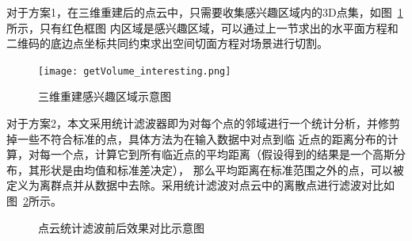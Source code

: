 对于方案1，在三维重建后的点云中，只需要收集感兴趣区域内的3D点集，如图~\ref{fig:getVolume_interesting}所示，只有红色框图
内区域是感兴趣区域，可以通过上一节求出的水平面方程和二维码的底边点坐标共同约束求出空间切面方程对场景进行切割。
\begin{figure}[H] %
  \centering
  \texttt{[image: getVolume\_interesting.png]}
  \caption{三维重建感兴趣区域示意图}
  \label{fig:getVolume_interesting}
\end{figure}
对于方案2，本文采用统计滤波器即为对每个点的邻域进行一个统计分析，并修剪掉一些不符合标准的点，具体方法为在输入数据中对点到临
近点的距离分布的计算，对每一个点，计算它到所有临近点的平均距离（假设得到的结果是一个高斯分布，其形状是由均值和标准差决定），
那么平均距离在标准范围之外的点，可以被定义为离群点并从数据中去除。采用统计滤波对点云中的离散点进行滤波对比如
图~\ref{fig:getVolume_3dconstr_filter}所示。
\begin{figure}[H]
  \centering
  \vskip0.5cm
  \caption{点云统计滤波前后效果对比示意图}\label{fig:getVolume_3dconstr_filter}
\end{figure}

